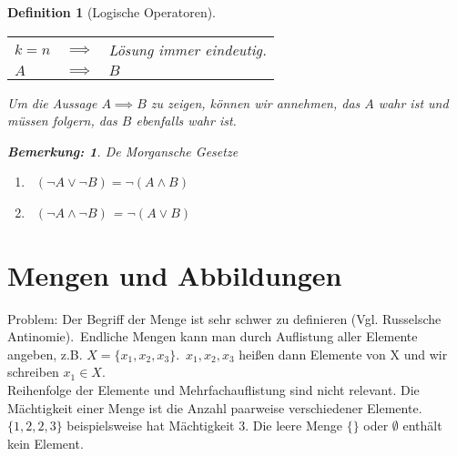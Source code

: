 \documentclass{report}
\newcommand{\IN}[1]{\index{#1|BH}}
\theoremstyle{customrem}
\newtheorem*{bemerkung}{Bemerkung\textnormal:}
\theoremstyle{customdef}
\newtheorem{definition}{Definition}[chapter]
\begin{document}
\begin{definition}[Logische Operatoren]
\begin{center}
			\begin{tabular}{l c l}
				$k = n$ & $\implies$ & Lösung immer eindeutig.\\
				$A$ & $\implies$ &  $B$\\
			\end{tabular}
		\end{center}
		Um die Aussage $A \implies B$ zu zeigen, können wir annehmen, das $A$ wahr ist und müssen folgern, das $B$ ebenfalls wahr ist.\\
		\begin{bemerkung} De Morgansche Gesetze
			\begin{enumerate}
				\item\ $(\neg A \lor \neg B) = \neg (A \land B)$
				\item\ $(\neg A \land \neg B)$ = $\neg (A \lor B)$
			\end{enumerate}
		\end{bemerkung}
	\end{definition}
	
	
	\section{Mengen und Abbildungen}
	\IN{Menge}
	Problem: Der Begriff der Menge ist sehr schwer zu definieren (Vgl. Russelsche Antinomie).\
	Endliche Mengen kann man durch Auflistung aller Elemente angeben, z.B. $X = \{x_1, x_2, x_3\}$.\ $x_1, x_2, x_3$ heißen dann Elemente von X und wir schreiben $x_1 \in X$.\\
	Reihenfolge der Elemente und Mehrfachauflistung sind nicht relevant. Die Mächtigkeit einer Menge ist die Anzahl paarweise verschiedener Elemente. $\{1, 2, 2, 3\}$ beispielsweise hat Mächtigkeit $3$.
	Die leere Menge $\{\}$ oder $\emptyset$ enthält kein Element.
	
\end{document}
